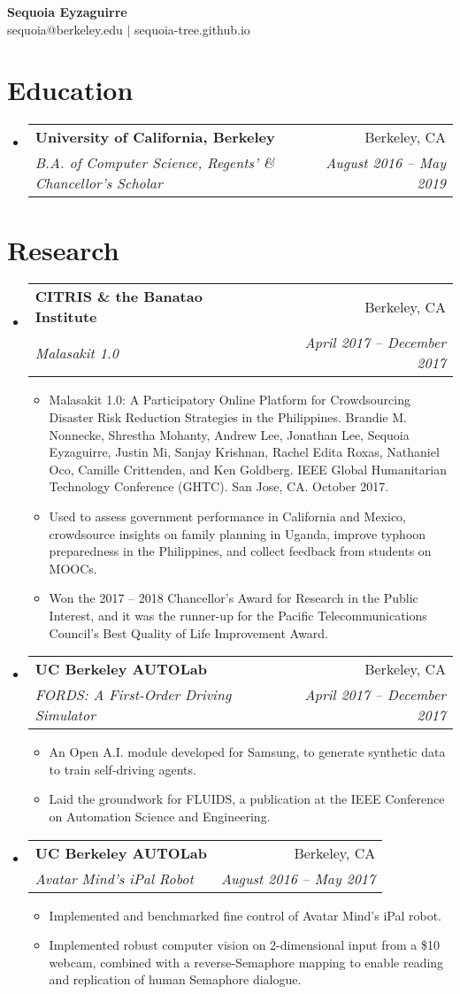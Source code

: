 \documentclass[letterpaper, 11pt]{article}
\makeatletter
\newcommand{\cvItem}[4]{
\vspace{-1pt}
\item
\begin{tabular*}{0.97\textwidth}{l@{\extracolsep{\fill}}r}
    \textbf{#1} & #2\\
    \textit{\small#3} & \textit{\small #4}\\
\end{tabular*}
\vspace{-5pt}
}
\newcommand{\cvSubitem}[1]{
\item\small{#1 \vspace{-2pt}}
}
\newcommand{\cvItemStart}{\begin{itemize}[leftmargin=*]}
\newcommand{\cvItemEnd}{\end{itemize}}
\newcommand{\cvSubitemStart}{\begin{itemize}}
\newcommand{\cvSubitemEnd}{\end{itemize}\vspace{-5pt}}
\makeatother
\begin{document}

\begin{center}
\textbf{\LARGE Sequoia Eyzaguirre}\\
sequoia@berkeley.edu $\vert$ sequoia-tree.github.io
\end{center}


\section{Education}

\cvItemStart
\cvItem
{University of California, Berkeley}
{Berkeley, CA}
{B.A. of Computer Science, Regents' \& Chancellor's Scholar}
{August 2016 -- May 2019}
\cvItemEnd


\section{Research}

\cvItemStart
\cvItem
{CITRIS \& the Banatao Institute}
{Berkeley, CA}
{Malasakit 1.0}
{April 2017 -- December 2017}
\cvSubitemStart
\cvSubitem{
Malasakit 1.0: A Participatory Online Platform for Crowdsourcing Disaster Risk Reduction Strategies in the Philippines. Brandie M. Nonnecke, Shrestha Mohanty, Andrew Lee, Jonathan Lee, Sequoia Eyzaguirre, Justin Mi, Sanjay Krishnan, Rachel Edita Roxas, Nathaniel Oco, Camille Crittenden, and Ken Goldberg. IEEE Global Humanitarian Technology Conference (GHTC). San Jose, CA. October 2017.
}
\cvSubitem{
Used to assess government performance in California and Mexico, crowdsource insights on family planning in Uganda, improve typhoon preparedness in the Philippines, and collect feedback from students on MOOCs.
}
\cvSubitem{
Won the 2017 -- 2018 Chancellor's Award for Research in the Public Interest, and it was the runner-up for the Pacific Telecommunications Council's Best Quality of Life Improvement Award.
}
\cvSubitemEnd
\cvItem
{UC Berkeley AUTOLab}
{Berkeley, CA}
{FORDS: A First-Order Driving Simulator}
{April 2017 -- December 2017}
\cvSubitemStart
\cvSubitem{
An Open A.I. module developed for Samsung, to generate synthetic data to train self-driving agents.
}
\cvSubitem{
Laid the groundwork for FLUIDS, a publication at the IEEE Conference on Automation Science and Engineering.
}
\cvSubitemEnd
\cvItem
{UC Berkeley AUTOLab}
{Berkeley, CA}
{Avatar Mind's iPal Robot}
{August 2016 -- May 2017}
\cvSubitemStart
\cvSubitem{
Implemented and benchmarked fine control of Avatar Mind's iPal robot.
}
\cvSubitem{
Implemented robust computer vision on 2-dimensional input from a \$10 webcam, combined with a reverse-Semaphore mapping to enable reading and replication of human Semaphore dialogue.
}
\cvSubitemEnd
\cvItemEnd
\end{document}
